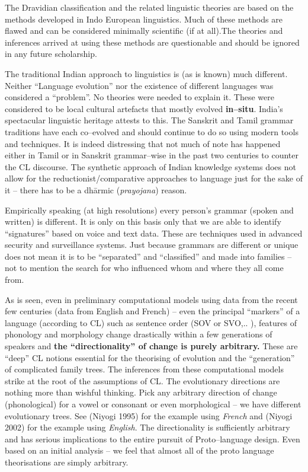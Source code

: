 The Dravidian classification and the related linguistic theories are based on the methods developed in Indo European linguistics. Much of these methods are flawed and can be considered minimally scientific (if at all).The theories and inferences arrived at using these methods are questionable and should be ignored in any future scholarship.

The traditional Indian approach to linguistics is (as is known) much different. Neither “Language evolution” nor the existence of different languages was considered a “problem”. No theories were needed to explain it. These were considered to be local cultural artefacts that mostly evolved \textbf{in–situ}. India’s spectacular linguistic heritage attests to this. The Sanskrit and Tamil grammar traditions have each co–evolved and should continue to do so using modern tools and techniques. It is indeed distressing that not much of note has happened either in Tamil or in Sanskrit grammar–wise in the past two centuries to counter the CL discourse. The synthetic approach of Indian knowledge systems does not allow for the reductionist/comparative approaches to language just for the sake of it – there has to be a dhārmic (\textit{prayojana}) reason.

Empirically speaking (at high resolutions) every person’s grammar (spoken and written) is different. It is only on this basis only that we are able to identify “signatures” based on voice and text data. These are techniques used in advanced security and surveillance systems. Just because grammars are different or unique does not mean it is to be “separated” and “classified” and made into families – not to mention the search for who influenced whom and where they all come from.

As is seen, even in preliminary computational models using data from the recent few centuries (data from English and French) – even the principal “markers” of a language (according to CL) such as sentence order (SOV or SVO,.. ), features of phonology and morphology change drastically within a few generations of speakers and \textbf{the “directionality” of change is purely arbitrary.} These are “deep” CL notions essential for the theorising of evolution and the “generation” of complicated family trees. The inferences from these computational models strike at the root of the assumptions of CL. The evolutionary directions are nothing more than wishful thinking. Pick any arbitrary direction of change (phonological) for a vowel or consonant or even morphological – we have different evolutionary trees. See (Niyogi 1995) for the example using \textit{French} and (Niyogi 2002) for the example using \textit{English}. The directionality is sufficiently arbitrary and has serious implications to the entire pursuit of Proto–language design. Even based on an initial analysis – we feel that almost all of the proto language theorisations are simply arbitrary.

